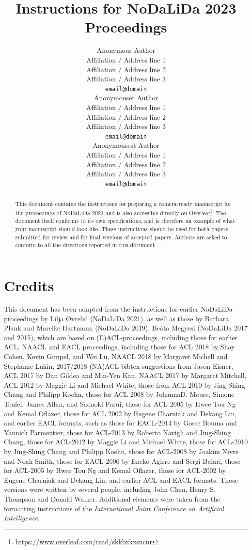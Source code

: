 \documentclass[11pt]{article}
\title{Instructions for NoDaLiDa 2023 Proceedings}
\author{Anonymous Author \\
  Affiliation / Address line 1 \\
  Affiliation / Address line 2 \\
  Affiliation / Address line 3 \\
  {\tt email@domain} \\\And
  Anonymouser Author \\
  Affiliation / Address line 1 \\
  Affiliation / Address line 2 \\
  Affiliation / Address line 3 \\
  {\tt email@domain} \\\And
  Anonymousest Author \\
  Affiliation / Address line 1 \\
  Affiliation / Address line 2 \\
  Affiliation / Address line 3 \\
  {\tt email@domain} \\}
\date{}
\begin{document}
\maketitle
\begin{abstract}
  This document contains the instructions for preparing a camera-ready
  manuscript for the proceedings of NoDaLiDa 2023 and is also accessible directly on Overleaf\footnote{\url{https://www.overleaf.com/read/skkbxkxsncnr}}. The document itself
  conforms to its own specifications, and is therefore an example of
  what your manuscript should look like. These instructions should be
  used for both papers submitted for review and for final versions of
  accepted papers.  Authors are asked to conform to all the directions
  reported in this document.
\end{abstract}



\section{Credits}

This document has been adapted from the instructions for earlier
NoDaLiDa proceedings by Lilja Øvrelid (NoDaLiDa 2021), as well as those by Barbara Plank and Mareike Hartmann (NoDaLiDa 2019), Be\'{a}ta Megyesi (NoDaLiDa 2017 and 2015), which are
based on (E)ACL-proceedings, including those for earlier ACL, NAACL and EACL proceedings,
including 
those for ACL 2018 by Shay Cohen, Kevin Gimpel, and Wei Lu, 
NAACL 2018 by Margaret Michell and Stephanie Lukin,
2017/2018 (NA)ACL bibtex suggestions from Jason Eisner,
ACL 2017 by Dan Gildea and Min-Yen Kan, 
NAACL 2017 by Margaret Mitchell, 
ACL 2012 by Maggie Li and Michael White, 
those from ACL 2010 by Jing-Shing Chang and Philipp Koehn, 
those for ACL 2008 by JohannaD. Moore, Simone Teufel, James Allan, and Sadaoki Furui, 
those for ACL 2005 by Hwee Tou Ng and Kemal Oflazer, 
those for ACL 2002 by Eugene Charniak and Dekang Lin, 
and earlier EACL formats, such as those for
EACL-2014 by Gosse Bouma
and Yannick Parmentier, those for ACL-2013 by Roberto Navigli
and Jing-Shing Chang, those for ACL-2012 by Maggie Li and Michael
White, those for ACL-2010 by Jing-Shing Chang and Philipp Koehn,
those for ACL-2008 by Joakim Nivre and Noah Smith, 
those for EACL-2006 by Eneko Agirre and Sergi Balari, 
those for ACL-2005 by Hwee Tou Ng and Kemal Oflazer, those for
ACL-2002 by Eugene Charniak and Dekang Lin, and earlier ACL and EACL
formats. Those versions were written by several people, including John
Chen, Henry S. Thompson and Donald Walker. Additional elements were
taken from the formatting instructions of the {\em International Joint
  Conference on Artificial Intelligence}.
\end{document}
